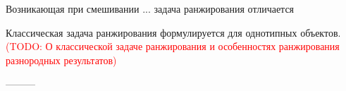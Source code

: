 \documentclass[12pt,a4paper]{report}
\newcommand\note[1]{\textcolor{red}{(#1)}}
\newcommand\todonote[1]{\note{TODO: #1}}
\begin{document}
Возникающая при смешивании ... задача ранжирования отличается 


Классическая задача ранжирования формулируется для однотипных объектов.
\todonote{О классической задаче ранжирования и особенностях ранжирования разнородных результатов}










---------

\end{document}
